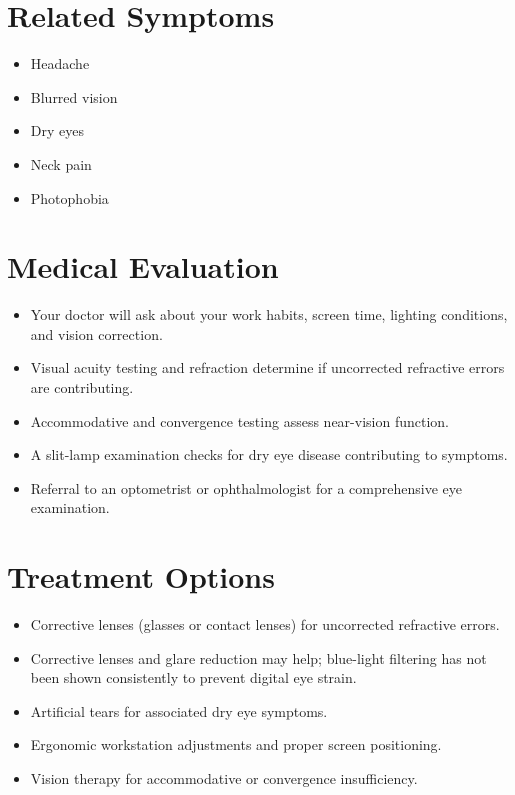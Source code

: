 \section*{Related Symptoms}
\begin{itemize}
  \item Headache
  \item Blurred vision
  \item Dry eyes
  \item Neck pain
  \item Photophobia
\end{itemize}

\section*{Medical Evaluation}
\begin{itemize}
  \item Your doctor will ask about your work habits, screen time, lighting conditions, and vision correction.
  \item Visual acuity testing and refraction determine if uncorrected refractive errors are contributing.
  \item Accommodative and convergence testing assess near-vision function.
  \item A slit-lamp examination checks for dry eye disease contributing to symptoms.
  \item Referral to an optometrist or ophthalmologist for a comprehensive eye examination.
\end{itemize}

\section*{Treatment Options}
\begin{itemize}
  \item Corrective lenses (glasses or contact lenses) for uncorrected refractive errors.
  \item Corrective lenses and glare reduction may help; blue-light filtering has not been shown consistently to prevent digital eye strain.
  \item Artificial tears for associated dry eye symptoms.
  \item Ergonomic workstation adjustments and proper screen positioning.
  \item Vision therapy for accommodative or convergence insufficiency.
\end{itemize}


